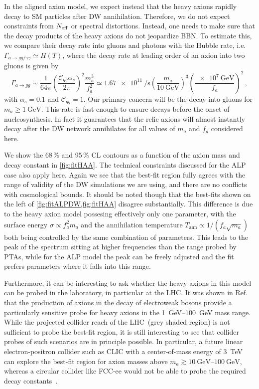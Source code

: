 \documentclass{article}
\begin{document}
In the aligned axion model, we expect instead that the heavy axions rapidly decay to SM particles after DW annihilation. Therefore, we do not expect constraints from $N_{\rm eff}$ or spectral distortions. Instead, one needs to make sure that the decay products of the heavy axions do not jeopardize BBN. To estimate this, we compare their decay rate into gluons and photons with the Hubble rate, i.e.\ $\Gamma_{a \rightarrow gg/\gamma \gamma} \simeq H(T)$, where the decay rate at leading order of an axion into two gluons is given by
\begin{equation}
    \Gamma_{a\rightarrow gg}\sim \frac{1}{64\pi} \left(\frac{\mathcal{C}_{gg} \alpha_{s}}{2 \pi}\right)^{2} \frac{m_{a}^{3}}{f_{a}^{2}} \simeq \SI{1.67e11}{\per\second} \left(\frac{m_{a}}{\SI{10}{\GeV}}\right)^{3}\left(\frac{\SI{e7}{\GeV}}{f_{a}}\right)^{2} \,,
\end{equation}
with $\alpha_{s} = 0.1$ and $\mathcal{C}_{gg}=1$. 
Our primary concern will be the decay into gluons for $m_{a}\geq \SI{1}{\GeV}$. This rate is fast enough to ensure decays before the onset of nucleosynthesis. In fact it guarantees that the relic axions will almost instantly decay after the DW network annihilates for all values of $m_{a}$ and $f_{a}$ considered here. 

We show the 68\,\% and 95\,\% CL contours as a function of the axion mass and decay constant in \cref{fig:fitHAA}. The technical constraints discussed for the ALP case also apply here. Again we see that the best-fit region fully agrees with the range of validity of the DW simulations we are using, and there are no conflicts with cosmological bounds. It should be noted though that the best-fits shown on the left of \cref{fig:fitALPDW,fig:fitHAA} disagree substantially. This difference is due to the heavy axion model possesing effectively only one parameter, with the surface energy $\sigma\propto f_a^2m_a$ and the annihilation temperature $T_\mathrm{ann}\propto 1/(f_a\sqrt{m_a})$ both being controlled by the same combination of parameters. This leads to the peak of the spectrum sitting at higher frequencies than the range probed by PTAs, while for the ALP model the peak can be freely adjusted and the fit prefers parameters where it falls into this range.

Furthermore, it can be interesting to ask whether the heavy axions in this model can be probed in the laboratory, in particular at the LHC. It was shown in Ref.~\cite{Bauer:2017ris} that the production of axions in the decay of electroweak bosons provide a particularly sensitive probe for heavy axions in the \SIrange{1}{100}{\GeV} mass range. 
While the projected collider reach of the LHC~(grey shaded region) is not sufficient to probe the best-fit region, it is still interesting to see that collider probes of such scenarios are in principle possible.
In particular, a future linear electron-positron collider such as CLIC with a center-of-mass energy of \SI{3}{\TeV} can explore the best-fit region for axion masses above $m_a \gtrsim \SIrange{10}{100}{\GeV}$, whereas a circular collider like FCC-ee would not be able to probe the required decay constants~\cite{Bauer:2018uxu}.
\end{document}
